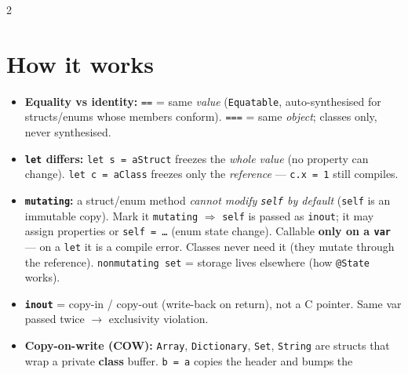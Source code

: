 \documentclass[8pt]{extarticle}
\begin{document}



\begin{multicols}{2}
\raggedright

\section{How it works}
\begin{itemize}
  \item \textbf{Equality vs identity:} \texttt{==} = same \emph{value}
        (\texttt{Equatable}, auto-synthesised for structs/enums whose members
        conform). \texttt{===} = same \emph{object}; classes only, never synthesised.
  \item \textbf{\texttt{let} differs:} \texttt{let s = aStruct} freezes the
        \emph{whole value} (no property can change). \texttt{let c = aClass}
        freezes only the \emph{reference} — \texttt{c.x = 1} still compiles.
  \item \textbf{\texttt{mutating}:} a struct/enum method \emph{cannot modify
        \texttt{self} by default} (\texttt{self} is an immutable copy). Mark it
        \texttt{mutating} $\Rightarrow$ \texttt{self} is passed as
        \texttt{inout}; it may assign properties or \texttt{self = …} (enum
        state change). Callable \textbf{only on a \texttt{var}} — on a
        \texttt{let} it is a compile error. Classes never need it (they mutate
        through the reference). \texttt{nonmutating set} = storage lives
        elsewhere (how \texttt{@State} works).
  \item \textbf{\texttt{inout}} = copy-in / copy-out (write-back on return), not a
        C pointer. Same var passed twice $\to$ exclusivity violation.
  \item \textbf{Copy-on-write (COW):} \texttt{Array}, \texttt{Dictionary},
        \texttt{Set}, \texttt{String} are structs that wrap a private
        \textbf{class} buffer. \texttt{b = a} copies the header and bumps the

\end{itemize}
\end{multicols}
\end{document}
